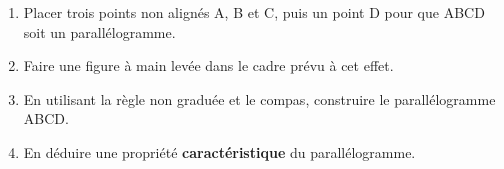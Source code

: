 \begin{activite}
\begin{changemargin}{-10mm}{-40mm}
        \begin{enumerate}
            \item Placer trois points non alignés A, B et C, puis un point D pour que ABCD soit un parallélogramme.
            \item Faire une figure à main levée dans le cadre prévu à cet effet.
            \item En utilisant la règle non graduée et le compas, construire le parallélogramme ABCD.
        \end{enumerate}
        \begin{enumerate}
            \setcounter{enumi}{3}
            \item En déduire une propriété \textbf{caractéristique} du parallélogramme.
        \end{enumerate}
    \end{changemargin}
\end{activite}
